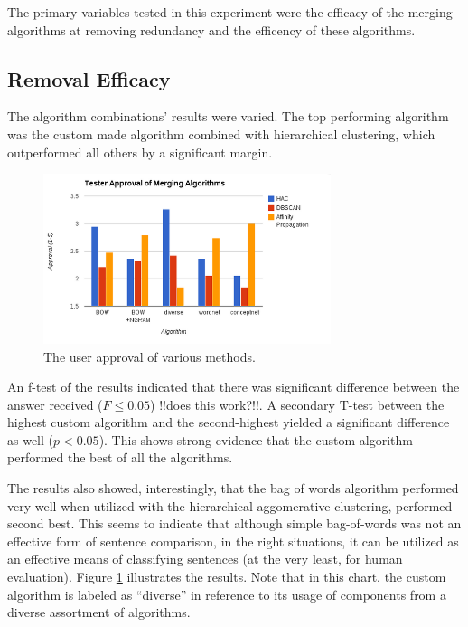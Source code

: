 The primary variables tested in this experiment were the efficacy of the merging algorithms at removing redundancy and the efficency of these algorithms.

\subsection{Removal Efficacy}
The algorithm combinations' results were varied.
The top performing algorithm was the custom made algorithm combined with hierarchical clustering, which outperformed all others by a significant margin.

\begin{figure}
	\begin{center}
	\includegraphics[width=0.75\textwidth]{figures/ratechart.png}
	\caption{The user approval of various methods.}
	\label{fig:approv}
	\end{center}
\end{figure}

An f-test of the results indicated that there was significant difference between the answer received ($F \le 0.05$) !!does this work?!!.  A secondary T-test between the highest custom algorithm and the second-highest yielded a significant difference as well ($p < 0.05$). This shows strong evidence that the custom algorithm performed the best of all the algorithms.

The results also showed, interestingly, that the bag of words algorithm performed very well when utilized with the hierarchical aggomerative clustering, performed second best.
This seems to indicate that although simple bag-of-words was not an effective form of sentence comparison, in the right situations, it can be utilized as an effective means of classifying sentences (at the very least, for human evaluation).
Figure \ref{fig:approv} illustrates the results. 
Note that in this chart, the custom algorithm is labeled as ``diverse'' in reference to its usage of components from a diverse assortment of algorithms.

